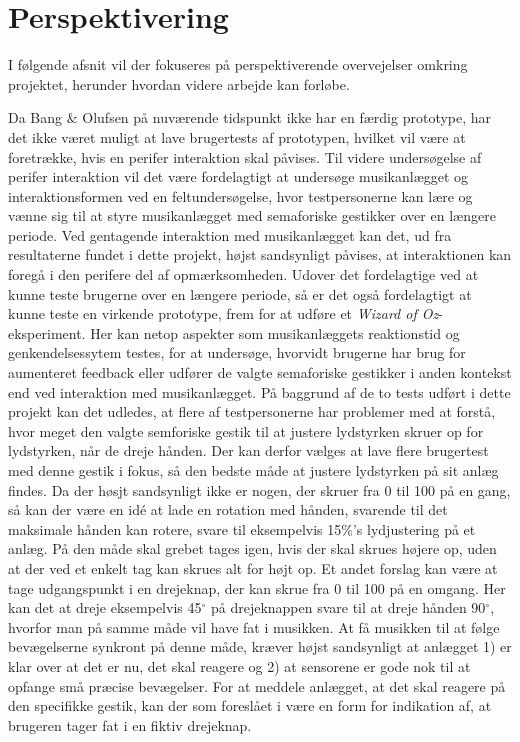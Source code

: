\chapter{Perspektivering}
\label{Perspektivering}
%
I følgende afsnit vil der fokuseres på perspektiverende overvejelser omkring projektet, herunder hvordan videre arbejde kan forløbe.

Da Bang $\&$ Olufsen på nuværende tidspunkt ikke har en færdig prototype, har det ikke været muligt at lave brugertests af prototypen, hvilket vil være at foretrække, hvis en perifer interaktion skal påvises. Til videre undersøgelse af perifer interaktion vil det være fordelagtigt at undersøge musikanlægget og interaktionsformen ved en feltundersøgelse, hvor testpersonerne kan lære og vænne sig til at styre musikanlægget med semaforiske gestikker over en længere periode. Ved gentagende interaktion med musikanlægget kan det, ud fra resultaterne fundet i dette projekt, højst sandsynligt påvises, at interaktionen kan foregå i den perifere del af opmærksomheden. Udover det fordelagtige ved at kunne teste brugerne over en længere periode, så er det også fordelagtigt at kunne teste en virkende prototype, frem for at udføre et \textit{Wizard of Oz}-eksperiment. Her kan netop aspekter som musikanlæggets reaktionstid og genkendelsessytem testes, for at undersøge, hvorvidt brugerne har brug for aumenteret feedback eller udfører de valgte semaforiske gestikker i anden kontekst end ved interaktion med musikanlægget.\blankline
%
På baggrund af de to tests udført i dette projekt kan det udledes, at flere af testpersonerne har problemer med at forstå, hvor meget den valgte semforiske gestik til at justere lydstyrken skruer op for lydstyrken, når de dreje hånden. Der kan derfor vælges at lave flere brugertest med denne gestik i fokus, så den bedste måde at justere lydstyrken på sit anlæg findes. Da der høsjt sandsynligt ikke er nogen, der skruer fra 0 til 100 på en gang, så kan der være en idé at lade en rotation med hånden, svarende til det maksimale hånden kan rotere, svare til eksempelvis 15$\%$'s lydjustering på et anlæg. På den måde skal grebet tages igen, hvis der skal skrues højere op, uden at der ved et enkelt tag kan skrues alt for højt op. Et andet forslag kan være at tage udgangspunkt i en drejeknap, der kan skrue fra 0 til 100 på en omgang. Her kan det at dreje eksempelvis 45$^{\circ}$ på drejeknappen svare til at dreje hånden 90$^{\circ}$, hvorfor man på samme måde vil have fat i musikken. At få musikken til at følge bevægelserne synkront på denne måde, kræver højst sandsynligt at anlægget 1) er klar over at det er nu, det skal reagere og 2) at sensorene er gode nok til at opfange små præcise bevægelser. For at meddele anlægget, at det skal reagere på den specifikke gestik, kan der som foreslået i  være en form for indikation af, at brugeren tager fat i en fiktiv drejeknap.\blankline

